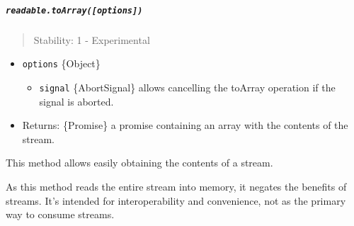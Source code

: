 \subparagraph{\texorpdfstring{\texttt{readable.toArray({[}options{]})}}{readable.toArray({[}options{]})}}\label{readable.toarrayoptions}

\begin{quote}
Stability: 1 - Experimental
\end{quote}

\begin{itemize}
\tightlist
\item
  \texttt{options} \{Object\}

  \begin{itemize}
  \tightlist
  \item
    \texttt{signal} \{AbortSignal\} allows cancelling the toArray
    operation if the signal is aborted.
  \end{itemize}
\item
  Returns: \{Promise\} a promise containing an array with the contents
  of the stream.
\end{itemize}

This method allows easily obtaining the contents of a stream.

As this method reads the entire stream into memory, it negates the
benefits of streams. It's intended for interoperability and convenience,
not as the primary way to consume streams.

